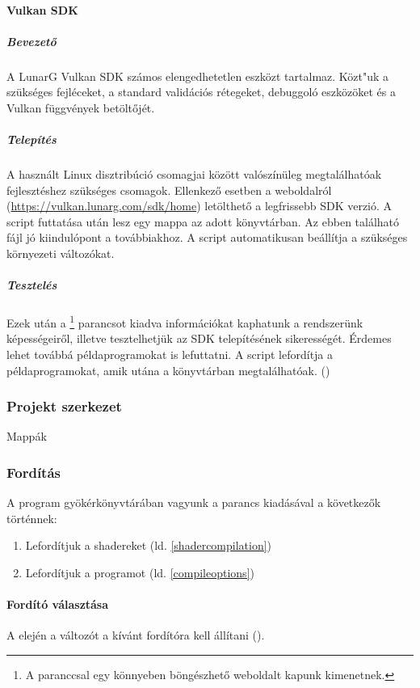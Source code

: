 \paragraph{Vulkan SDK}
\subparagraph{Bevezet\H o}
A LunarG Vulkan SDK sz\'amos elengedhetetlen eszk\"ozt tartalmaz. K\"ozt"uk a sz\"uks\'eges fejl\'eceket, a standard valid\'aci\'os r\'etegeket, debuggol\'o eszk\"oz\"oket \'es a Vulkan f\"uggv\'enyek bet\"olt\H oj\'et. 
\subparagraph{Telep\'it\'es}
A haszn\'alt Linux disztrib\'uci\'o csomagjai k\"oz\"ott val\'osz\'in\"uleg megtal\'alhat\'oak fejleszt\'eshez sz\"uks\'eges csomagok. 
\newline
Ellenkez\H o esetben a weboldalr\'ol (\url{https://vulkan.lunarg.com/sdk/home}) let\"olthet\H o a legfrissebb SDK verzi\'o.
A script futtat\'asa ut\'an lesz egy  mappa az adott k\"onyvt\'arban.
Az ebben tal\'alhat\'o  f\'ajl j\'o kiindul\'opont a tov\'abbiakhoz.
A  script automatikusan be\'all\'itja a sz\"uks\'eges k\"ornyezeti v\'altoz\'okat.
\subparagraph{Tesztel\'es}
Ezek ut\'an a \footnote{A  paranccsal egy k\"onnyeben b\"ong\'eszhet\H o weboldalt kapunk kimenetnek.} parancsot kiadva inform\'aci\'okat kaphatunk a rendszer\"unk k\'epess\'egeir\H ol, illetve tesztelhetj\"uk az SDK telep\'it\'es\'enek sikeress\'eg\'et. 
\'Erdemes lehet tov\'abb\'a p\'eldaprogramokat is lefuttatni. A  script leford\'itja a p\'eldaprogramokat, amik ut\'ana a  k\"onyvt\'arban megtal\'alhat\'oak. ()

\subsubsection{Projekt szerkezet}
Mapp\'ak

\subsubsection{Ford\'it\'as}
A program gy\"ok\'erk\"onyvt\'ar\'aban vagyunk
a  parancs kiad\'as\'aval a k\"ovetkez\H ok t\"ort\'ennek:
\begin{enumerate}
	\item Leford\'itjuk a shadereket (ld. \ref{shadercompilation})
	\item Leford\'itjuk a programot (ld. \ref{compileoptions})
\end{enumerate}

\paragraph{Ford\'it\'o v\'alaszt\'asa}
A  elej\'en a  v\'altoz\'ot a k\'iv\'ant ford\'it\'ora kell \'all\'itani ().
